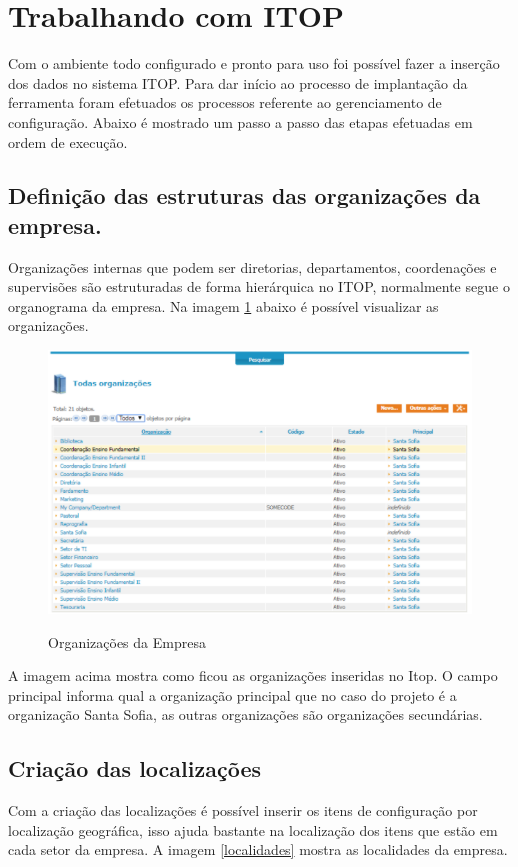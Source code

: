 \documentclass[eso]{bcc}
\begin{document}
\section{Trabalhando com ITOP}

Com o ambiente todo configurado e pronto para uso foi possível fazer a inserção dos dados no sistema ITOP. Para dar início ao processo de implantação da ferramenta foram efetuados os processos referente ao gerenciamento de configuração. Abaixo é mostrado um passo a passo das etapas efetuadas  em ordem de execução.
\subsection{Definição das estruturas das organizações da empresa.
}
Organizações internas que podem ser diretorias, departamentos, coordenações e supervisões são estruturadas de forma hierárquica no ITOP, normalmente segue o organograma da empresa. Na imagem \ref{organizacao} abaixo é possível visualizar as organizações.
\newpage

\begin{figure}[!h]
\centering
\caption[Organizações da empresa]{Organizações da Empresa}
\includegraphics[scale=0.9]{Figuras/itop.png}
\label{organizacao}
\end{figure}

A imagem acima mostra como ficou as organizações inseridas no Itop. O campo principal informa qual a organização principal que no caso do projeto é a organização Santa Sofia, as outras organizações são organizações secundárias.

\subsection{Criação das localizações}
Com a criação das localizações é possível inserir os itens de configuração por localização geográfica, isso ajuda bastante na localização dos itens que estão em cada  setor da empresa. A imagem \ref{localidades} mostra as localidades da empresa.
\newpage
\end{document}
